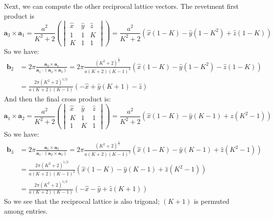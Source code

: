 \documentclass[12pt]{article}
\begin{document}
Next, we can compute the other reciprocal lattice vectors. The revetment first product is
\begin{equation}
    \mathbf{a}_3 \times \mathbf{a}_1 = \frac{a^2}{K^2 + 2} \left(\begin{vmatrix} \hat{x} & \hat{y} & \hat{z} \\ 1 & 1 & K \\ K & 1 & 1 \end{vmatrix}\right) = \frac{a^2}{K^2 + 2} \left(\hat{x}(1 - K) - \hat{y}(1-K^2) + \hat{z}(1-K)\right)
\end{equation}
So we have:
\begin{align}
    \mathbf{b}_2 &= 2\pi \frac{\mathbf{a}_3 \times \mathbf{a}_1}{\mathbf{a}_1 \cdot (\mathbf{a}_2 \times \mathbf{a}_3)} = 2\pi{\frac{(K^2 +2)^{\frac{1}{2}}}{a (K+2)(K-1)^2}} \left(\hat{x}(1 - K) - \hat{y}(1-K^2) - \hat{z}(1-K)\right) \\
    &= \frac{2\pi(K^2 +2)^{1/2}}{a (K+2)(K-1)} \left(-\hat{x} + \hat{y}(K+1) - \hat{z}\right)
\end{align}
And then the final cross product is:
\begin{equation}
    \mathbf{a}_1 \times \mathbf{a}_2 = \frac{a^2}{K^2 + 2} \left(\begin{vmatrix} \hat{x} & \hat{y} & \hat{z} \\ K & 1 & 1 \\ 1 & K & 1 \end{vmatrix}\right) = \frac{a^2}{K^2 + 2} \left(\hat{x}(1-K) - \hat{y}(K-1) + \hat{z}(K^2 - 1)\right)
\end{equation}
So we have:
\begin{align}
    \mathbf{b}_3 &= 2\pi \frac{\mathbf{a}_1 \times \mathbf{a}_2}{\mathbf{a}_1 \cdot (\mathbf{a}_2 \times \mathbf{a}_3)} = 2\pi{\frac{(K^2 +2)^{\frac{1}{2}}}{a (K+2)(K-1)^2}} \left(\hat{x}(1-K) - \hat{y}(K-1) + \hat{z}(K^2 - 1)\right) \\
    &= \frac{2\pi(K^2 +2)^{1/2}}{a (K+2)(K-1)^2} \left(\hat{x}(1-K) - \hat{y}(K-1) + \hat{z}(K^2 - 1)\right) \\
    &= \frac{2\pi(K^2 +2)^{1/2}}{a (K+2)(K-1)} \left(-\hat{x} - \hat{y} + \hat{z}(K+1)\right)
\end{align}
So we see that the reciprocal lattice is also trigonal; $(K+1)$ is permuted among entries.
\end{document}
